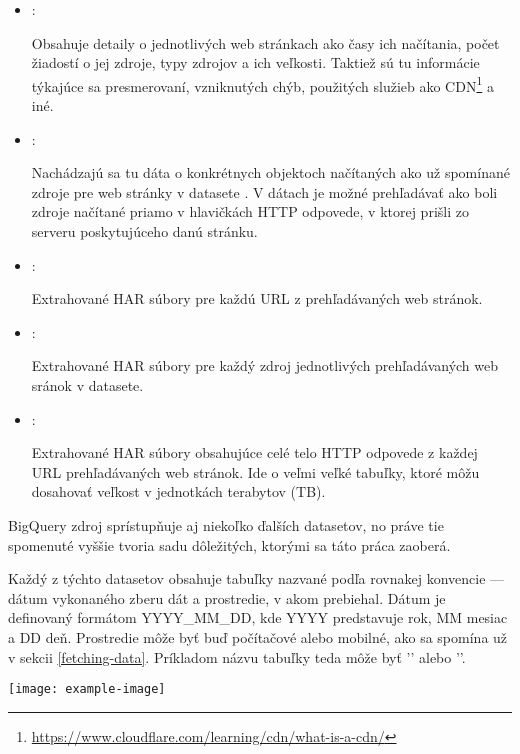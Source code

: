 \begin{itemize}
    \item {}:

    Obsahuje detaily o jednotlivých web stránkach ako časy ich načítania, počet žiadostí o jej zdroje, typy zdrojov a ich veľkosti.
    Taktiež sú tu informácie týkajúce sa presmerovaní, vzniknutých chýb, použitých služieb ako CDN\footnote{\href{https://www.cloudflare.com/learning/cdn/what-is-a-cdn/}{https://www.cloudflare.com/learning/cdn/what-is-a-cdn/}} a iné.
    
    \item {}:

    Nachádzajú sa tu dáta o konkrétnych objektoch načítaných ako už spomínané zdroje pre web stránky v datasete .
    V dátach je možné prehľadávať ako boli zdroje načítané priamo v hlavičkách HTTP odpovede, v ktorej prišli zo serveru poskytujúceho danú stránku.
    
    \item {}:

    Extrahované HAR súbory pre každú URL z prehľadávaných web stránok.
    
    \item {}:

    Extrahované HAR súbory pre každý zdroj jednotlivých prehľadávaných web sránok v  datasete.
    
    \item {}:

    Extrahované HAR súbory obsahujúce celé telo HTTP odpovede z každej URL prehľadávaných web stránok.
    Ide o veľmi veľké tabuľky, ktoré môžu dosahovať veľkost v jednotkách terabytov (TB).
\end{itemize}

BigQuery zdroj  sprístupňuje aj niekoľko ďalších datasetov, no práve tie spomenuté vyššie tvoria sadu dôležitých, ktorými sa táto práca zaoberá. 

Každý z týchto datasetov obsahuje tabuľky nazvané podľa rovnakej konvencie --- dátum vykonaného zberu dát a prostredie, v akom prebiehal.
Dátum je definovaný formátom YYYY\_MM\_DD, kde YYYY predstavuje rok, MM mesiac a DD deň. Prostredie môže byť buď počítačové alebo mobilné, ako sa spomína už v sekcii \ref{fetching-data}.
Príkladom názvu tabuľky teda môže byť '' alebo ''.

\begin{center}
\noindent\texttt{[image: example-image]}    
\end{center}

